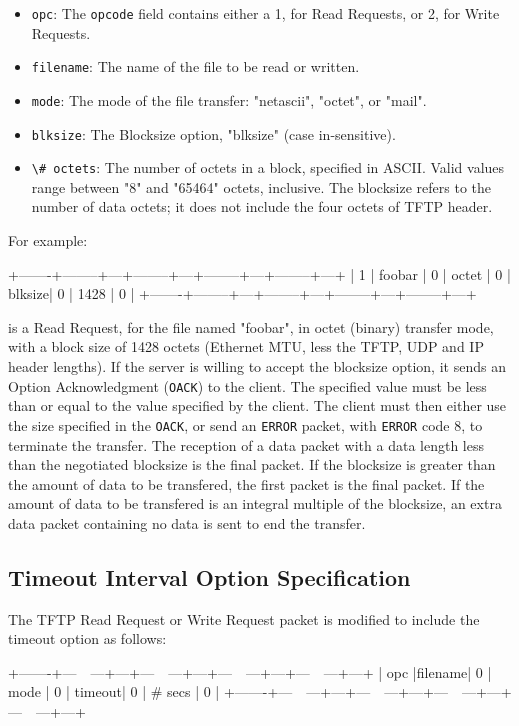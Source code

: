 \documentclass[12pt]{article}
\begin{document}
\begin{itemize}
\item \verb|opc|: The \verb|opcode| field contains either a 1, for Read Requests, or 2, for Write Requests.
\item \verb|filename|: The name of the file to be read or written.
\item \verb|mode|: The mode of the file transfer: "netascii", "octet", or "mail".
\item \verb|blksize|: The Blocksize option, "blksize" (case in-sensitive).
\item \verb|\# octets|: The number of octets in a block, specified in ASCII. Valid values range between "8" and "65464" octets, inclusive. The blocksize refers to the number of data octets; it does not include the four octets of TFTP header.
\end{itemize}

For example:

   +-------+--------+---+--------+---+--------+---+--------+---+
   |  1  | foobar | 0 | octet | 0 | blksize| 0 | 1428 | 0 |
   +-------+--------+---+--------+---+--------+---+--------+---+

is a Read Request, for the file named "foobar", in octet (binary) transfer mode, with a block size of 1428 octets (Ethernet MTU, less the TFTP, UDP and IP header lengths). If the server is willing to accept the blocksize option, it sends an Option Acknowledgment (\verb|OACK|) to the client. The specified value must be less than or equal to the value specified by the client. The client must then either use the size specified in the \verb|OACK|, or send an \verb|ERROR| packet, with  \verb|ERROR| code 8, to terminate the transfer. The reception of a data packet with a data length less than the negotiated blocksize is the final packet. If the blocksize is greater than the amount of data to be transfered, the first packet is the final packet. If the amount of data to be transfered is an integral multiple of the blocksize, an extra data packet containing no data is sent to end the transfer.

\subsection{Timeout Interval Option Specification}
The TFTP Read Request or Write Request packet is modified to include the timeout option as follows:

   +-------+---~~---+---+---~~---+---+---~~---+---+---~~---+---+
   | opc |filename| 0 | mode | 0 | timeout| 0 | \# secs | 0 |
   +-------+---~~---+---+---~~---+---+---~~---+---+---~~---+---+
\end{document}
